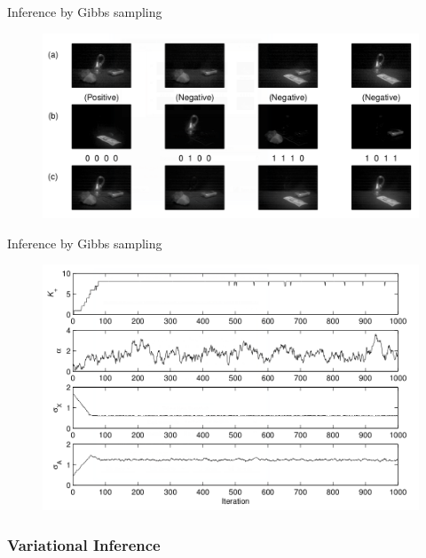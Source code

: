 \documentclass[13pt]{beamer}
\begin{document}
\begin{frame}{Inference by Gibbs sampling} 
\begin{figure}
\begin{center}
    \includegraphics[scale=0.4]{./img/ibp-inference-reconstruction.png}
\end{center}
\end{figure}   
\end{frame}
\begin{frame}{Inference by Gibbs sampling} 
\begin{figure}
\begin{center}
    \includegraphics[scale=0.4]{./img/ibp-inference-example.png}
\end{center}
\end{figure}   
\end{frame}
\begin{frame}
\frametitle{Variational Inference}
\end{frame}
\end{document}
